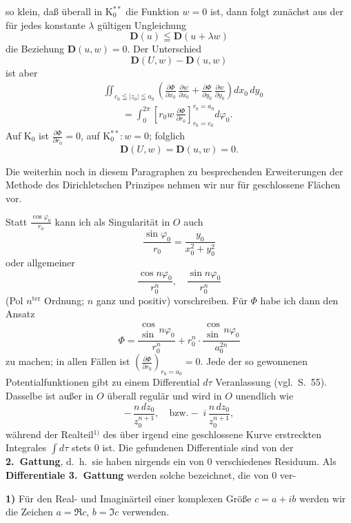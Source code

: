 \documentclass{article}
\begin{document}
so klein, daß überall in $\mathrm{K}_0^{**}$ die Funktion $w = 0$ ist, dann folgt zunächst aus der für jedes konstante $\lambda$ gültigen Ungleichung
\[ \mathbf{D}(u) \leqq \mathbf{D}(u + \lambda w) \]
die Beziehung $\mathbf{D}(u, w) = 0$. Der Unterschied
\[ \mathbf{D}(U, w) - \mathbf{D}(u, w) \]
ist aber
\[ \begin{aligned}
&\iint_{c_0 \leqq |z_0| \leqq a_0} \left( \frac{\partial\Phi}{\partial x_0}\,\frac{\partial w}{\partial x_0} + \frac{\partial\Phi}{\partial y_0}\,\frac{\partial w}{\partial y_0} \right) dx_0\,dy_0 \\
&\qquad = \int_0^{2\pi} \left[ r_0 w\,\frac{\partial\Phi}{\partial r_0} \right]_{r_0 = c_0}^{r_0 = a_0} d\varphi_0.
\end{aligned} \]
Auf $\mathrm{K}_0$ ist $\frac{\partial\Phi}{\partial r_0} = 0$, auf $\mathrm{K}_0^{**}\colon w = 0$; folglich
\[ \mathbf{D}(U, w) = \mathbf{D}(u, w) = 0. \]

Die weiterhin noch in diesem Paragraphen zu besprechenden Erweiterungen der Methode des Dirichletschen Prinzipes nehmen wir nur für geschlossene Flächen vor.

Statt $\frac{\cos\varphi_0}{r_0}$ kann ich als Singularität in $O$ auch
\[ \frac{\sin\varphi_0}{r_0} = \frac{y_0}{x_0^2 + y_0^2} \]
oder allgemeiner
\[ \frac{\cos n\varphi_0}{r_0^n}, \quad \frac{\sin n\varphi_0}{r_0^n} \]
(Pol $n^{\text{ter}}$ Ordnung; $n$ ganz und positiv) vorschreiben. Für $\Phi$ habe ich dann den Ansatz
\[ \Phi = \frac{\substack{\cos\\\sin} n\varphi_0}{r_0^n} + r_0^n \cdot \frac{\substack{\cos\\\sin} n\varphi_0}{a_0^{2n}} \]
zu machen; in allen Fällen ist $\left(\frac{\partial\Phi}{\partial r_0}\right)_{r_0 = a_0} = 0$. Jede der so gewonnenen Potentialfunktionen gibt zu einem Differential $d\tau$ Veranlassung (vgl.\ S.~55). Dasselbe ist außer in $O$ überall regulär und wird in $O$ unendlich wie
\[ -\,\frac{n\,dz_0}{z_0^{n+1}}, \quad \text{bzw.} -\; i\,\frac{n\,dz_0}{z_0^{n+1}}, \]
während der Realteil${}^{1)}$ des über irgend eine geschlossene Kurve erstreckten Integrales $\displaystyle\int d\tau$ stets $0$ ist. Die gefundenen Differentiale sind von der \textbf{2.\ Gattung}, d.~h.\ sie haben nirgends ein von $0$ verschiedenes Residuum. Als \textbf{Differentiale 3.\ Gattung} werden solche bezeichnet, die von $0$ ver-

\textbf{1)} Für den Real- und Imaginärteil einer komplexen Größe $c = a + ib$ werden wir die Zeichen $a = \Re c$, $b = \Im c$ verwenden.
\end{document}
